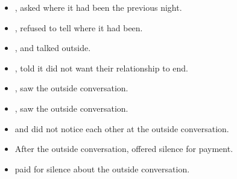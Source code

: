 \begin{itemize}
  \item {},  asked  where it had been the previous night.
  \item {},  refused to tell  where it had been.
  \item {},  and  talked outside.
  \item {},  told  it did not want their relationship to end.
  \item {},  saw the outside conversation.
  \item {},  saw the outside conversation.
  \item {} and  did not notice each other at the outside conversation.
  \item After the outside conversation,  offered  silence for payment.
  \item {} paid  for silence about the outside conversation.
\end{itemize}
